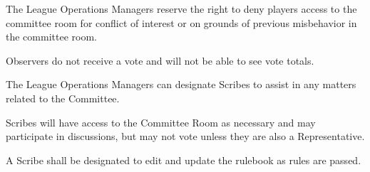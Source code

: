 \begin{deepEnumerate}
    \begin{deepEnumerate}
        \item The League Operations Managers reserve the right to deny players access to the committee room for conflict of interest
        or on grounds of previous misbehavior in the committee room.
        \item Observers do not receive a vote and will not be able to see vote totals.
    \end{deepEnumerate}
    \item The League Operations Managers can designate Scribes to assist in any matters related to the Committee.
    \begin{deepEnumerate}
        \item Scribes will have access to the Committee Room as necessary and may participate in discussions, but may not vote unless they are also a Representative.
        \item A Scribe shall be designated to edit and update the rulebook as rules are passed.
    \end{deepEnumerate}
\end{deepEnumerate}
    
